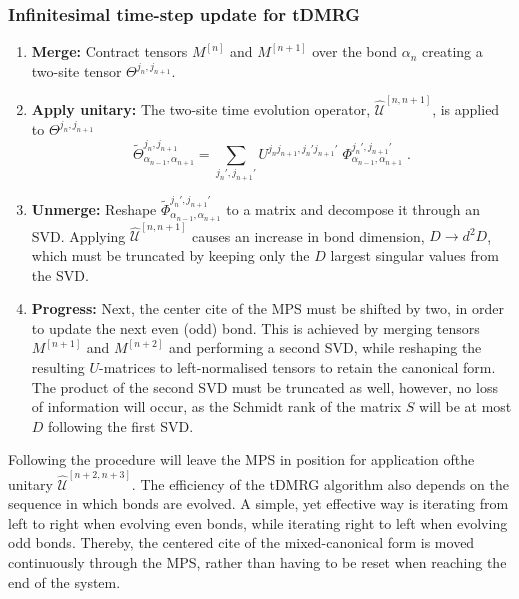 \subsubsection{Infinitesimal time-step update for tDMRG}
\begin{enumerate}
\item
\textbf{Merge:} Contract tensors $M^{[n]}$ and $M^{[n+1]}$ over the bond $\alpha_{n}$ creating a two-site tensor $\Theta^{j_n , j_{n+1}}$.

\item
\textbf{Apply unitary:} The two-site time evolution operator, $\hat{\mathcal{U}}^{[n, n+1]}$, is applied to $\Theta^{j_n , j_{n+1}}$
\begin{equation}
	\tilde{\Theta}_{\alpha_{n-1} , \alpha_{n+1}}^{j_n , j_{n+1} } = \sum_{j_n ', j_{n+1}'} U^{j_n  j_{n+1} , j_n '  j_{n+1}'} \; \Phi_{\alpha_{n-1} , \alpha_{n+1}}^{j_n ', j_{n+1} ' } \; .
\end{equation}

\item
\textbf{Unmerge:} Reshape $\tilde{\Phi}_{\alpha_{n-1} , \alpha_{n+1}}^{j_n ', j_{n+1} '}$ to a matrix and decompose it through an SVD. Applying $\hat{\mathcal{U}}^{[n, n+1]}$ causes an increase in bond dimension, $D \rightarrow d^2 D$, which must be truncated by keeping only the $D$ largest singular values from the SVD. 

\item
\textbf{Progress:}  Next, the center cite of the MPS must be shifted by two, in order to update the next even (odd) bond. This is achieved by merging tensors $M^{[n+1]}$ and $M^{[n+2]}$ and performing a second SVD, while reshaping the resulting $U$-matrices to left-normalised tensors to retain the canonical form. The product of the second SVD must be truncated as well, however, no loss of information will occur, as the Schmidt rank of the matrix $S$ will be at most $D$ following the first SVD. 
\end{enumerate}
Following the procedure will leave the MPS in position for application ofthe unitary $\hat{\mathcal{U}}^{[n+2 , n+3]}$. The efficiency of the tDMRG algorithm also depends on the sequence in which bonds are evolved. A simple, yet effective way is iterating from left to right when evolving even bonds, while iterating right to left when evolving odd bonds. Thereby, the centered cite of the mixed-canonical form is moved continuously through the MPS, rather than having to be reset when reaching the end of the system.\\

